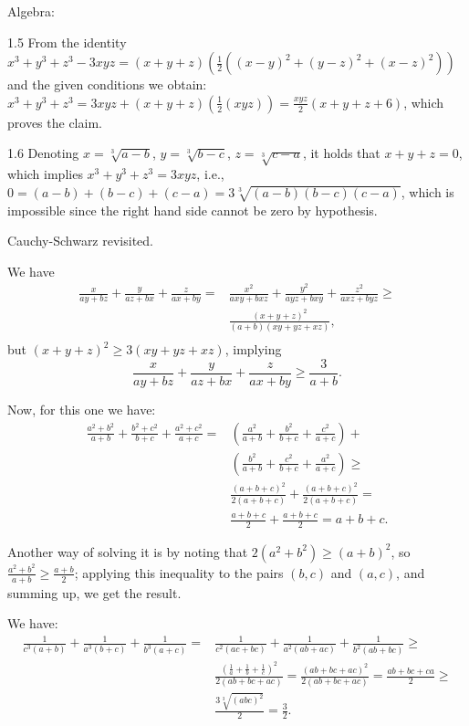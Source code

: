 \documentclass[12pt]{minimal}
\begin{document}
Algebra:

1.5 From the identity $x^3 + y^3 + z^3 - 3xyz = (x + y + z)(\frac{1}{2}(
    (x - y)^2 + (y - z)^2 + (x - z)^2))$ and the given conditions we obtain:
    $x^3 + y^3 + z^3 = 3xyz + (x + y + z)(\frac{1}{2}(xyz)) = \frac{xyz}{2}
    (x + y + z + 6)$, which proves the claim.

1.6 Denoting $x = \sqrt[3]{a - b}$, $y = \sqrt[3]{b - c}$, $z = \sqrt[3]{c - a}$,
    it holds that $x + y + z = 0$, which implies $x^3 + y^3 + z^3 = 3xyz$, i.e.,
    $0 = (a - b) + (b - c) + (c - a) = 3\sqrt[3]{(a - b)(b - c)(c - a)}$, which
    is impossible since the right hand side cannot be zero by hypothesis.

Cauchy-Schwarz revisited.

    We have
    \begin{align*}
	\frac{x}{ay + bz} + \frac{y}{az + bx} + \frac{z}{ax + by} =
    & \frac{x^2}{axy + bxz} + \frac{y^2}{ayz + bxy} + \frac{z^2}{axz + byz} \geq \\
    & \frac{(x + y + z)^2}{(a + b)(xy + yz + xz)}, \\
    \end{align*}
    but $(x + y + z)^2 \geq 3(xy + yz + xz)$, implying
    $$\frac{x}{ay + bz} + \frac{y}{az + bx} + \frac{z}{ax + by} \geq \frac{3}{a + b}.$$

    Now, for this one we have:
    \begin{align*}
	  \frac{a^2 + b^2}{a + b} + \frac{b^2 + c^2}{b + c} + \frac{a^2 + c^2}{a + c} =
    & \left(\frac{a^2}{a + b} + \frac{b^2}{b + c} + \frac{c^2}{a + c}\right) + \\
    & \left(\frac{b^2}{a + b} + \frac{c^2}{b + c} + \frac{a^2}{a + c} \right) \geq \\
    & \frac{(a + b + c)^2}{2(a + b + c)} + \frac{(a + b + c)^2}{2(a + b + c)} = \\
    & \frac{a + b + c}{2} + \frac{a + b + c}{2} = a + b + c.
    \end{align*}

    Another way of solving it is by noting that $2(a^2 + b^2) \geq (a + b)^2$,
    so $\frac{a^2 + b^2}{a + b} \geq \frac{a + b}{2}$; applying this inequality
    to the pairs $(b, c)$ and $(a, c)$, and summing up, we get the result.

    We have:
    \begin{align*}
        \frac{1}{c^3(a + b)} + \frac{1}{a^3(b + c)} + \frac{1}{b^3(a + c)} = 
        & \frac{1}{c^2(ac + bc)} + \frac{1}{a^2(ab + ac)} + \frac{1}{b^2(ab + bc)} \geq \\
        & \frac{(\frac{1}{a} + \frac{1}{b} + \frac{1}{c})^2}{2(ab + bc + ac)} = 
        \frac{(ab + bc + ac)^2}{2(ab + bc + ac)} = \frac{ab + bc + ca}{2} \geq \\
        & \frac{3\sqrt[3]{(abc)^2}}{2} = \frac{3}{2}.
    \end{align*}
\end{document}
